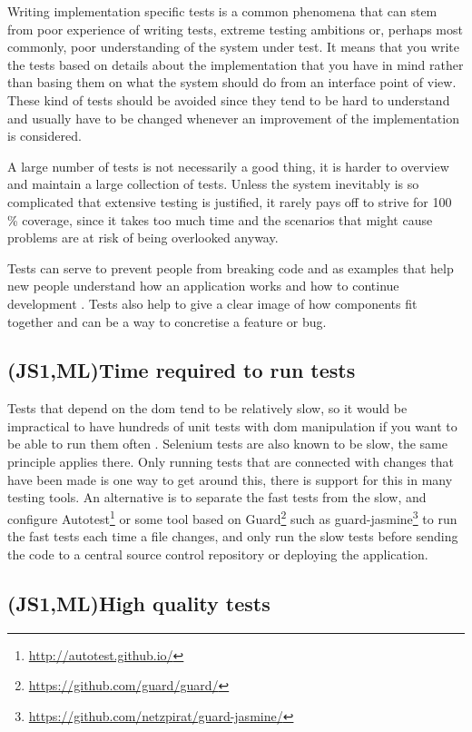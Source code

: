 \documentclass[11pt]{article}
\begin{document}
Writing implementation specific tests is a common phenomena that can stem from poor experience of writing tests, extreme testing ambitions or, perhaps most commonly, poor understanding of the system under test. It means that you write the tests based on details about the implementation that you have in mind rather than basing them on what the system should do from an interface point of view. These kind of tests should be avoided since they tend to be hard to understand and usually have to be changed whenever an improvement of the implementation is considered.

A large number of tests is not necessarily a good thing, it is harder to overview and maintain a large collection of tests. Unless the system inevitably is so complicated that extensive testing is justified, it rarely pays off to strive for 100 \% coverage, since it takes too much time and the scenarios that might cause problems are at risk of being overlooked anyway. \cite[question~28]{Edelstam}

Tests can serve to prevent people from breaking code and as examples that help new people understand how an application works and how to continue development \cite[questions~31-32]{Edelstam}. Tests also help to give a clear image of how components fit together and can be a way to concretise a feature or bug.

\subsection{(JS1,ML)Time required to run tests}

Tests that depend on the \gls{dom} tend to be relatively slow, so it would be impractical to have hundreds of unit tests with \gls{dom} manipulation if you want to be able to run them often \cite[questions~21-22]{Stenmark}. Selenium tests are also known to be slow, the same principle applies there. Only running tests that are connected with changes that have been made is one way to get around this, there is support for this in many testing tools. An alternative is to separate the fast tests from the slow, and configure Autotest\footnote{\url{http://autotest.github.io/}} or some tool based on Guard\footnote{\url{https://github.com/guard/guard/}} such as guard-jasmine\footnote{\url{https://github.com/netzpirat/guard-jasmine/}} to run the fast tests each time a file changes, and only run the slow tests before sending the code to a central source control repository or deploying the application.

\subsection{(JS1,ML)High quality tests}
\label{HighQuality}
\end{document}
